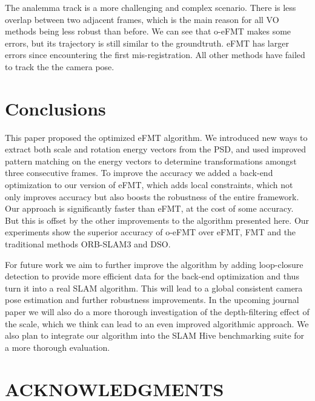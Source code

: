 \documentclass[letterpaper, 10 pt, conference]{ieeeconf}  %
\begin{document}
The analemma track is a more challenging and complex scenario. There is less overlap between two adjacent frames, which is the main reason for all VO methods being less robust than before. We can see that o-eFMT makes some errors, but its trajectory is still similar to the groundtruth. eFMT has larger errors since encountering the first mis-registration. All other methods have failed to track the the camera pose.





\section{Conclusions}
This paper proposed the optimized eFMT algorithm. We introduced new ways to extract both scale and rotation energy vectors from the PSD, and used improved pattern matching on the energy vectors to determine transformations amongst three consecutive frames. To improve the accuracy we added a back-end optimization to our version of eFMT, which adds local constraints, which not only improves accuracy but also boosts the robustness of the entire framework. Our approach is significantly faster than eFMT, at the cost of some accuracy. But this is offset by the other improvements to the algorithm presented here. Our experiments show the superior accuracy of o-eFMT over eFMT, FMT and the traditional methods ORB-SLAM3 and DSO.

For future work we aim to further improve the algorithm by adding loop-closure detection to provide more efficient data for the back-end optimization and thus turn it into a real SLAM algorithm. This will lead to a global consistent camera pose estimation and further robustness improvements. In the upcoming journal paper we will also do a more thorough investigation of the depth-filtering effect of the scale, which we think can lead to an even improved algorithmic approach. We also plan to integrate our algorithm into the SLAM Hive benchmarking suite \cite{yang2023slamhive} for a more thorough evaluation. 

\section*{ACKNOWLEDGMENTS}
\end{document}
